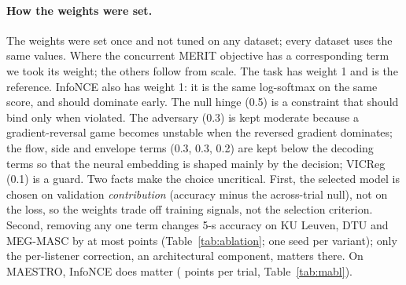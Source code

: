 \documentclass[twoside]{article}
\begin{document}
\paragraph{How the weights were set.} The weights were set once and not tuned on any dataset;
every dataset uses the same values. Where the concurrent MERIT
objective \citep{merit2026} has a corresponding term we took its weight; the others follow
from scale. The task has weight 1 and is the reference. InfoNCE also has weight 1: it is
the same log-softmax on the same score, and should dominate early. The null hinge (0.5) is
a constraint that should bind only when violated. The adversary (0.3) is kept moderate
because a gradient-reversal game becomes unstable when the reversed gradient dominates; the
flow, side and envelope terms (0.3, 0.3, 0.2) are kept below the decoding terms so that the
neural embedding is shaped mainly by the decision; VICReg (0.1) is a guard. Two facts make
the choice uncritical. First, the selected model is chosen on validation
\emph{contribution} (accuracy minus the across-trial null), not on the loss, so the
weights trade off training signals, not the selection criterion. Second, removing any one
term changes 5-s accuracy on KU Leuven, DTU and MEG-MASC by at most \ablOtherMax{} points
(Table~\ref{tab:ablation}; one seed per variant); only the per-listener correction, an
architectural component, matters there. On MAESTRO, InfoNCE does matter
(\maAblNce{} points per trial, Table~\ref{tab:mabl}).

\begin{table}[h]\centering\small
\caption{Weighted loss terms during training (each already multiplied by its weight; mean
over folds and seeds of the logged epoch average), at the first epoch and at the selected
epoch. Chance: value of a term for a decoder at chance ($K=2$ candidates, batch $B=32$).
``--'': the side head needs two talkers in known positions. Five Broderick runs evaluated
from saved checkpoints have no logged history and are omitted.}\label{tab:loss_terms}

\end{table}
\end{document}
